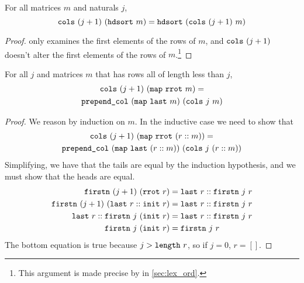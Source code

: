 \documentclass[sigplan,10pt,anonymous,review]{thesis}
\begin{document}
\begin{theorem}
  For all matrices $m$ and naturals $j$,
  \begin{equation*}
    \texttt{\textup{cols}}~(j+1)~(\texttt{\textup{hdsort}}~m) = \texttt{\textup{hdsort}}~(\texttt{\textup{cols}}~(j+1)~m)
  \end{equation*}
\end{theorem}
\begin{proof}
   only examines the first elements of the rows of $m$,
  and $\texttt{\textup{cols}}~(j+1)$ doesn't alter the first elements of the rows
  of $m$.\footnote{This argument is made precise by
     in \cref{sec:lex_ord}.}
\end{proof}
\begin{theorem}
  For all $j$ and matrices $m$ that has rows all of length less than $j$,
  \begin{gather*}
    \texttt{\textup{cols}}~(j+1)~(\texttt{\textup{map}}~\texttt{\textup{rrot}}~m) = \\
    \texttt{\textup{prepend\_col}}~(\texttt{\textup{map}}~\texttt{\textup{last}}~m)~(\texttt{\textup{cols}}~j~m)
  \end{gather*}
\end{theorem}
\begin{proof}
  We reason by induction on $m$. In the inductive case we need to show that
  \begin{gather*}
    \texttt{\textup{cols}}~(j+1)~(\texttt{\textup{map}}~\texttt{\textup{rrot}}~(r::m)) = \\
    \texttt{\textup{prepend\_col}}~(\texttt{\textup{map}}~\texttt{\textup{last}}~(r::m))~(\texttt{\textup{cols}}~j~(r::m))
  \end{gather*}
  Simplifying, we have that the tails are equal by the induction
  hypothesis, and we must show that the heads are equal.
  \begin{align*}
    \texttt{\textup{firstn}}~(j+1)~(\texttt{\textup{rrot}}~r) &= \texttt{\textup{last}}~r :: \texttt{\textup{firstn}}~j~r \\
    \texttt{\textup{firstn}}~(j+1)~(\texttt{\textup{last}}~r :: \texttt{\textup{init}}~r) &= \texttt{\textup{last}}~r
    :: \texttt{\textup{firstn}}~j~r \\
    \texttt{\textup{last}}~r :: \texttt{\textup{firstn}}~j~(\texttt{\textup{init}}~r) &= \texttt{\textup{last}}~r :: \texttt{\textup{firstn}}~j~r \\
    \texttt{\textup{firstn}}~j~(\texttt{\textup{init}}~r) &= \texttt{\textup{firstn}}~j~r
  \end{align*}
  The bottom equation is true because $j > \texttt{\textup{length}}~r$, so if $j=
  0$, $r = []$.
\end{proof}
\end{document}
